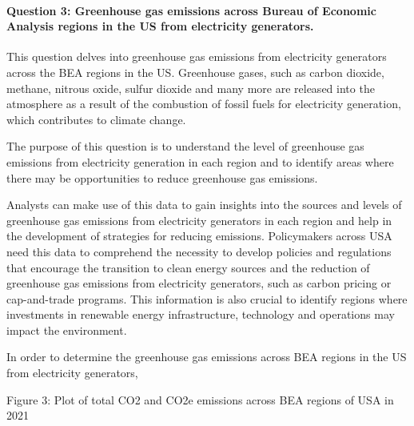\documentclass[
]{article}
\begin{document}
\hypertarget{question-3-greenhouse-gas-emissions-across-bureau-of-economic-analysis-regions-in-the-us-from-electricity-generators.}{%
\paragraph{Question 3: Greenhouse gas emissions across Bureau of
Economic Analysis regions in the US from electricity
generators.}\label{question-3-greenhouse-gas-emissions-across-bureau-of-economic-analysis-regions-in-the-us-from-electricity-generators.}}

This question delves into greenhouse gas emissions from electricity
generators across the BEA regions in the US. Greenhouse gases, such as
carbon dioxide, methane, nitrous oxide, sulfur dioxide and many more are
released into the atmosphere as a result of the combustion of fossil
fuels for electricity generation, which contributes to climate change.

The purpose of this question is to understand the level of greenhouse
gas emissions from electricity generation in each region and to identify
areas where there may be opportunities to reduce greenhouse gas
emissions.

Analysts can make use of this data to gain insights into the sources and
levels of greenhouse gas emissions from electricity generators in each
region and help in the development of strategies for reducing emissions.
Policymakers across USA need this data to comprehend the necessity to
develop policies and regulations that encourage the transition to clean
energy sources and the reduction of greenhouse gas emissions from
electricity generators, such as carbon pricing or cap-and-trade
programs. This information is also crucial to identify regions where
investments in renewable energy infrastructure, technology and
operations may impact the environment.

In order to determine the greenhouse gas emissions across BEA regions in
the US from electricity generators,

Figure 3: Plot of total CO2 and CO2e emissions across BEA regions of USA
in 2021
\end{document}

